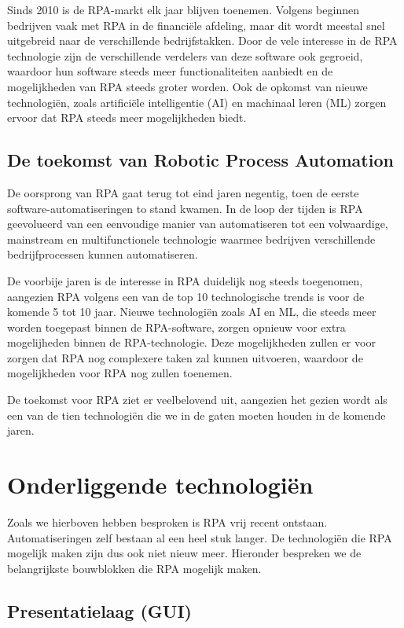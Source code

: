 Sinds 2010 is de RPA-markt elk jaar blijven toenemen. Volgens \textcite{Jiles2020} beginnen bedrijven vaak met RPA in de financiële afdeling, maar dit wordt meestal snel uitgebreid naar de verschillende bedrijfstakken. Door de vele interesse in de RPA technologie zijn de verschillende verdelers van deze software ook gegroeid, waardoor hun software steeds meer functionaliteiten aanbiedt en de mogelijkheden van RPA steeds groter worden. Ook de opkomst van nieuwe technologiën, zoals artificiële intelligentie (AI) en machinaal leren (ML) zorgen ervoor dat RPA steeds meer mogelijkheden biedt.

\subsection{De toekomst van Robotic Process Automation}

De oorsprong van RPA gaat terug tot eind jaren negentig, toen de eerste software-automatiseringen to stand kwamen. In de loop der tijden is RPA geevolueerd van een eenvoudige manier van automatiseren tot een volwaardige, mainstream en multifunctionele technologie waarmee bedrijven verschillende bedrijfprocessen kunnen automatiseren.

De voorbije jaren is de interesse in RPA duidelijk nog steeds toegenomen, aangezien RPA volgens \textcite{Laxmikant2023} een van de top 10 technologische trends is voor de komende 5 tot 10 jaar. Nieuwe technologiën zoals AI en ML, die steeds meer worden toegepast binnen de RPA-software, zorgen opnieuw voor extra mogelijheden binnen de RPA-technologie. Deze mogelijkheden zullen er voor zorgen dat RPA nog complexere taken zal kunnen uitvoeren, waardoor de mogelijkheden voor RPA nog zullen toenemen.

De toekomst voor RPA ziet er veelbelovend uit, aangezien het gezien wordt als een van de tien technologiën die we in de gaten moeten houden in de komende jaren.

\section{Onderliggende technologiën}

Zoals we hierboven hebben besproken is RPA vrij recent ontstaan. Automatiseringen zelf bestaan al een heel stuk langer. De technologiën die RPA mogelijk maken zijn dus ook niet nieuw meer. Hieronder bespreken we de belangrijkste bouwblokken die RPA mogelijk maken.

\subsection{Presentatielaag (GUI)}


